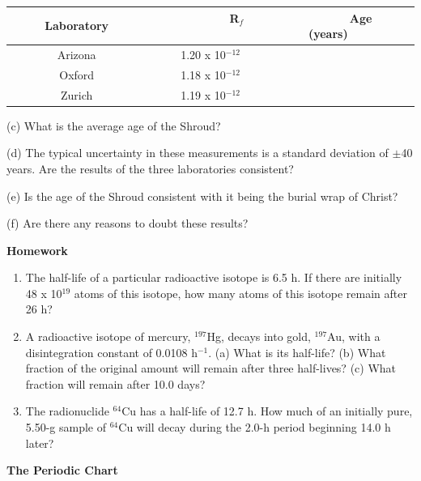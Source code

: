 \vspace{0.3cm}
{\centering \begin{tabular}{|c|c|c|}
\hline 
~~~~~Laboratory~~~~~&
~~~~~~~~R\( _{f} \)~~~~~~~~&
~~~~~Age (years)~~~~~\\
\hline
\hline 
Arizona&
1.20 x 10\( ^{-12} \)&
\\
\hline 
Oxford&
1.18 x 10\( ^{-12} \)&
\\
\hline 
Zurich&
1.19 x 10\( ^{-12} \)&
\\
\hline
\end{tabular}\par}
\vspace{0.3cm}

\vspace{5in}
(c) What is the average age of the Shroud? 
\vspace{1in}

(d) The typical uncertainty in these measurements is a standard deviation
of \( \pm  \)40 years. Are the results of the three laboratories
consistent? 
\vspace{1in}

\vspace{15mm}
(e) Is the age of the Shroud consistent with it being the burial wrap
of Christ? 
\vspace{1in}

(f) Are there any reasons to doubt these results?
\vspace{1in}

\textbf{Homework} 

\begin{enumerate}
\item The half-life of a particular radioactive isotope is 6.5 h. If there
are initially 48 x 10\( ^{19} \) atoms of this isotope, how many
atoms of this isotope remain after 26 h? 
\item A radioactive isotope of mercury, \( ^{197} \)Hg, decays into gold,
\( ^{197} \)Au, with a disintegration constant of 0.0108 h\( ^{-1} \).
(a) What is its half-life? (b) What fraction of the original amount
will remain after three half-lives? (c) What fraction will remain
after 10.0 days?
\item The radionuclide \( ^{64} \)Cu has a half-life of 12.7 h. How much
of an initially pure, 5.50-g sample of \( ^{64} \)Cu will decay during
the 2.0-h period beginning 14.0 h later? 
\end{enumerate}

\textbf{The Periodic Chart} 


